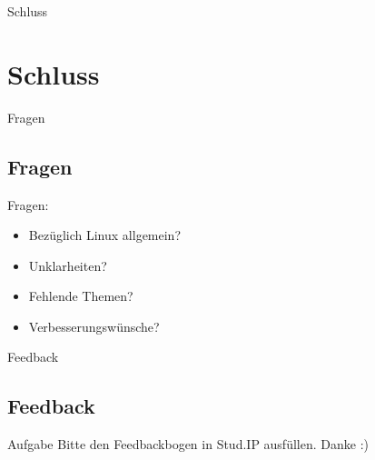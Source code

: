 
\begin{frame}{Schluss}
    \section{Schluss}\label{sec:schluss}
\end{frame}

\begin{frame}{Fragen}
    \subsection{Fragen}\label{subsec:Fragen}

    Fragen:

    \begin{itemize}
        \item Bezüglich Linux allgemein?
        \item Unklarheiten?
        \item Fehlende Themen?
        \item Verbesserungswünsche?
    \end{itemize}

\end{frame}

\begin{frame}{Feedback}
    \subsection{Feedback}\label{subsec:feedback}

    \vspace{0.5cm}
    \begin{alertblock}{Aufgabe}
        Bitte den Feedbackbogen in Stud.IP ausfüllen.
        \linebreak
        Danke :)
    \end{alertblock}

\end{frame}